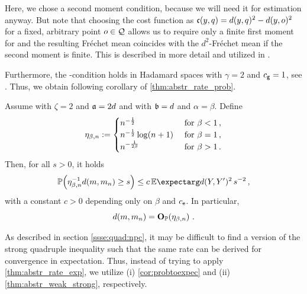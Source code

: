 Here, we chose a second moment condition, because we will need it for estimation anyway. But note that choosing the cost function as $\mathfrak{c}(y,q) = d(y,q)^2 - d(y,o)^2$ for a fixed, arbitrary point $o\in\mathcal{Q}$ allows us to require only a finite first moment for  and the resulting Fréchet mean coincides with the $d^2$-Fréchet mean if the second moment is finite. This is described in more detail and utilized in \cite{sturm03}.

Furthermore, the -condition holds in Hadamard spaces with $\gamma=2$ and $c_{\mathsf{g}} = 1$, see \cite[Proposition 4.4]{sturm03}.
%
Thus, we obtain following corollary of \autoref{thm:abstr_rate_prob}.
%
\begin{corollary}
	Assume  with $\zeta = 2$ and $\mathfrak{a} = 2d$ and   with $\mathfrak{b} = d$ and $\alpha=\beta$.
	Define
	\begin{equation*}
		\eta_{\beta,n} := 
		\begin{cases} 
			n^{-\frac12} & \text{ for }\beta < 1\, ,\\
			n^{-\frac12} \log(n+1) & \text{ for } \beta = 1\, ,\\
			n^{-\frac1{2\beta}} & \text{ for } \beta > 1\, .
		\end{cases} 
	\end{equation*}
	Then, for all $s > 0$, it holds
	\begin{equation*}
		\PrOf{\eta_{\beta,n}^{-1} d(m,m_n) \geq s} \leq c \,\Ex{d(Y,Y\pr)^2} \,s^{-2}
		\eqcm
	\end{equation*}
	with a constant $c > 0$ depending only on $\beta$ and $c_{\mathsf{e}}$.
	In particular,
	\begin{equation*}
		d(m, m_n) = \mathbf{O}_{\mathbb{P}}\!\left( \eta_{\beta,n} \right)
		\, .
	\end{equation*}
\end{corollary}
%
As described in section \ref{ssse:quad:npc}, it may be difficult to find a version of the strong quadruple inequality such that the same rate can be derived for convergence in expectation. Thus, instead of trying to apply \autoref{thm:abstr_rate_exp}, we utilize (i) \autoref{cor:probtoexpec} and (ii) \autoref{thm:abstr_weak_strong}, respectively.
%
